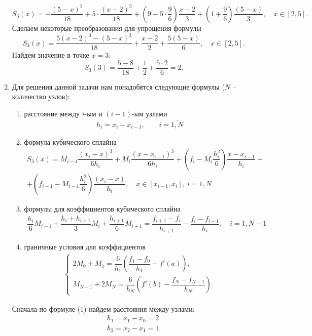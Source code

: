 \documentclass[a4paper, 12pt]{article}
\begin{document}
\begin{enumerate}
	$$
	S_3(x) = -\dfrac{(5 - x)^3}{18} +5\cdot\dfrac{(x-2)^3}{18} + \left(9 -5\cdot\dfrac{9}{6}\right)\dfrac{x-2}{3} + \left(1 + \dfrac{9}{6}\right)\dfrac{(5 - x)}{3},\quad x\in [2, 5].
	$$
	Сделаем некоторые преобразования для упрощения формулы
	$$
	S_3(x) = \dfrac{5(x - 2)^3 - (5-x)^3}{18} + \dfrac{x-2}{2} + \dfrac{5(5 - x)}{6},\quad x\in [2, 5].
	$$
	Найдем значение в точке $x=3$:
	$$
	S_3(3) = \dfrac{5 - 8}{18} + \dfrac{1}{2} + \dfrac{5\cdot 2}{6} = 2.
	$$
	\newpage
	\item 
	\hypertarget{t13}{}
	Для решения данной задачи нам понадобятся следующие формулы ($N$ -- количество узлов):\begin{enumerate}
		\item расстояние между $i$-ым и $(i-1)$-ым узлами \begin{eqnarray}
			h_i=x_i - x_{i-1},\qquad i=\overline{1,N}\label{1}
		\end{eqnarray}
		\item формула кубического сплайна\begin{multline}
			S_3(x) = M_{i-1}\dfrac{(x_i - x)^3}{6h_i} + M_{i}\dfrac{(x-x_{i-1})^3}{6h_i} + \left(f_i - M_i\dfrac{h_i^2}{6}\right)\dfrac{x-x_{i-1}}{h_i} +\\+ \left(f_{i-1} - M_{i-1}\dfrac{h_i^2}{6}\right)\dfrac{(x_i - x)}{h_i},\quad x\in [x_{i-1}, x_i],\ i = \overline{1,N}
		\end{multline}
		\item формулы для коэффициентов кубического сплайна
		\begin{multline}
			\dfrac{h_i}{6}M_{i-1} + \dfrac{h_i + h_{i+1}}{3}M_i + \dfrac{h_{i+1}}{6}M_{i+1} = \dfrac{f_{i+1} - f_i}{h_{i+1}} - \dfrac{f_i - f_{i-1}}{h_i},\quad i = \overline {1,N-1}
		\end{multline}
		\item граничные условия для коэффициентов \begin{eqnarray}
			\begin{cases}
				2M_0 + M_1 = \dfrac{6}{h_1}\left(\dfrac{f_1-f_0}{h_1} - f'(a)\right),\\
				M_{N-1} + 2M_N = \dfrac{6}{h_N}\left(f'(b) - \dfrac{f_N-f_{N-1}}{h_N} \right).
			\end{cases}
		\end{eqnarray}
	\end{enumerate}
	Сначала по формуле (1) найдем расстояния между узлами:
	$$\begin{matrix}
		h_1 = x_1 - x_0 = 2\\
		h_2 = x_2 - x_1 = 1.
	\end{matrix}$$

\end{enumerate}
\end{document}
